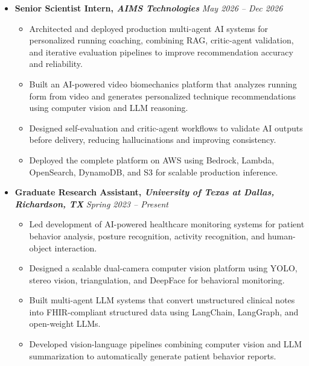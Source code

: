 \documentclass[10pt,a4paper,sans]{moderncv}
\begin{document}
\begin{itemize}[leftmargin=0.0 cm, label={}]

    \item \textbf{Senior Scientist Intern, \textit{AIMS Technologies}} \hfill \textit{May 2026 -- Dec 2026}
    \begin{itemize}[leftmargin=0.6cm, label={\textbullet}]
        \item Architected and deployed production multi-agent AI systems for personalized running coaching, combining RAG, critic-agent validation, and iterative evaluation pipelines to improve recommendation accuracy and reliability.

        \item Built an AI-powered video biomechanics platform that analyzes running form from video and generates personalized technique recommendations using computer vision and LLM reasoning.

        \item Designed self-evaluation and critic-agent workflows to validate AI outputs before delivery, reducing hallucinations and improving consistency.

        \item Deployed the complete platform on AWS using Bedrock, Lambda, OpenSearch, DynamoDB, and S3 for scalable production inference.
    \end{itemize}

    \item \textbf{Graduate Research Assistant, \textit{University of Texas at Dallas, Richardson, TX}} \hfill \textit{Spring 2023 -- Present}
    \begin{itemize}[leftmargin=0.6cm, label={\textbullet}]
        \item Led development of AI-powered healthcare monitoring systems for patient behavior analysis, posture recognition, activity recognition, and human-object interaction.
        
        \item Designed a scalable dual-camera computer vision platform using YOLO, stereo vision, triangulation, and DeepFace for behavioral monitoring.
        
        \item Built multi-agent LLM systems that convert unstructured clinical notes into FHIR-compliant structured data using LangChain, LangGraph, and open-weight LLMs.
        
        \item Developed vision-language pipelines combining computer vision and LLM summarization to automatically generate patient behavior reports.


\end{itemize}
\end{itemize}
\end{document}
